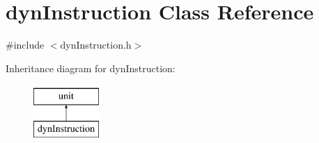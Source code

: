 \hypertarget{classdynInstruction}{
\section{dynInstruction Class Reference}
\label{classdynInstruction}
}


{\ttfamily \#include $<$dynInstruction.h$>$}

Inheritance diagram for dynInstruction:\begin{figure}[H]
\begin{center}
\leavevmode
\includegraphics[height=2.000000cm]{classdynInstruction}
\end{center}
\end{figure}
